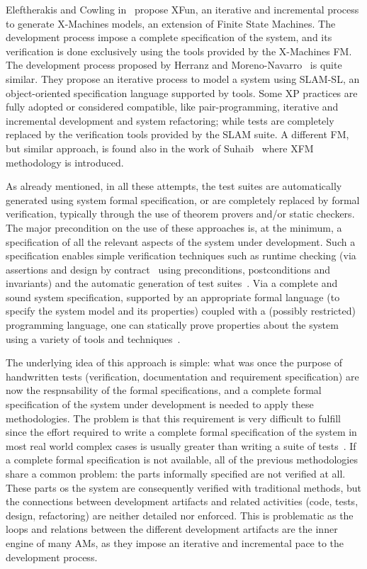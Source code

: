 \documentclass[english]{lni}
\begin{document}
Eleftherakis and Cowling in~\cite{Eleftherakis2003} propose XFun, an iterative and incremental process to generate X-Machines models, an extension of Finite State Machines. 
The development process impose a complete specification of the system, and its verification is done exclusively using the tools provided by the X-Machines FM. 
The development process proposed by Herranz and Moreno-Navarro~\cite{Herranz2003b} is quite similar.
They propose an iterative process to model a system using SLAM-SL, an object-oriented specification language supported by tools. 
Some XP practices are fully adopted or considered compatible, like pair-programming, iterative and incremental development and system refactoring; while tests are completely replaced by the verification tools provided by the SLAM suite.
A different FM, but similar approach, is found also in the work of Suhaib~\cite{Suhaib2005} where XFM methodology is introduced.

As already mentioned, in all these attempts, the test suites are automatically generated using system formal specification, or are completely replaced by formal verification, typically through the use of theorem provers and/or static checkers. 
The major precondition on the use of these approaches is, at the minimum, a specification of all the relevant aspects of the system under development. 
Such a specification enables simple verification techniques such as runtime checking (via assertions and design by contract~\cite{Meyer1997} using preconditions, postconditions and invariants) and the automatic generation of test suites~\cite{Cheon2002,Cheon2004,Cheon2005}.
Via a complete and sound system specification, supported by an appropriate formal language (to specify the system model and its properties) coupled with a (possibly restricted) programming language, one can statically prove properties about the system using a variety of tools and techniques~\cite{CatanoHuisman02,DetlefsNelsonSaxe2005,KiniryCok04}.

The underlying idea of this approach is simple: what was once the purpose of handwritten tests (verification, documentation and requirement specification) are now the respnsability of the formal specifications, and a complete formal specification of the system under development is needed to apply these methodologies.
The problem is that this requirement is very difficult to fulfill since the effort required to write a complete formal specification of the system in most real world complex cases is usually greater than writing a suite of tests~\cite{Glass2002}.
If a complete formal specification is not available, all of the previous methodologies share a common problem: the parts informally specified are not verified at all.
These parts os the system are consequently verified with traditional methods, but the connections between development artifacts and related activities (code, tests, design, refactoring) are neither detailed nor enforced.
This is problematic as the loops and relations between the different development artifacts are the inner engine of many AMs, as they impose an iterative and incremental pace to the development process.
\end{document}

